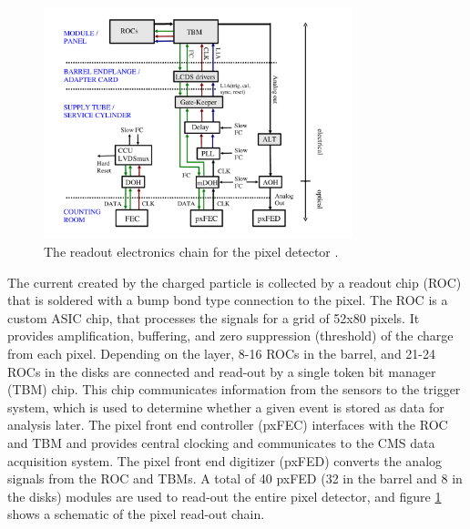 \begin{figure}[h]
   \centering
  \includegraphics[width=0.8\textwidth]{Figures/CMS_Diagrams/Tracker__Pixel_Readout.pdf}
  \caption{The readout electronics chain for the pixel detector \cite{CMS:CMS_Machine_Chatrchyan:2008aa}.} \label{fig:tracker_pixel_readout}
\end{figure}


\par The current created by the charged particle is collected by a
readout chip (ROC) that is soldered with a bump bond type connection
to the pixel.  The ROC is a custom ASIC chip, that processes the
signals for a grid of 52x80 pixels.  It provides amplification,
buffering, and zero suppression (threshold) of the charge from each
pixel.  Depending on the layer, 8-16 ROCs in the barrel, and 21-24 ROCs in
the disks are connected and read-out by a single token bit manager
(TBM) chip.  This chip communicates information from the sensors to
the trigger system, which is used to determine whether a given event
is stored as data for analysis later.  The pixel front end controller
(pxFEC) interfaces with the ROC and TBM and provides central clocking
and communicates to the CMS data acquisition system.  The pixel front
end digitizer (pxFED) converts the analog signals from the ROC and
TBMs.  A total of 40 pxFED (32 in the barrel and 8 in the disks)
modules are used to read-out the entire pixel detector, and figure
\ref{fig:tracker_pixel_readout} shows a schematic of the pixel
read-out chain. 

